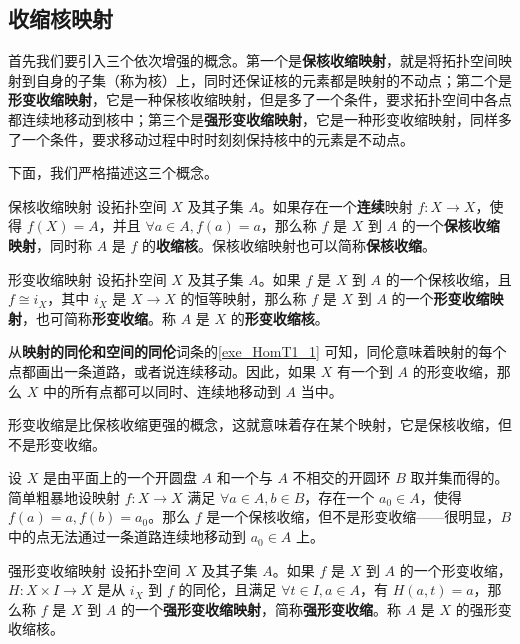 

\subsection{收缩核映射}

首先我们要引入三个依次增强的概念。第一个是\textbf{保核收缩映射}，就是将拓扑空间映射到自身的子集（称为核）上，同时还保证核的元素都是映射的不动点；第二个是\textbf{形变收缩映射}，它是一种保核收缩映射，但是多了一个条件，要求拓扑空间中各点都连续地移动到核中；第三个是\textbf{强形变收缩映射}，它是一种形变收缩映射，同样多了一个条件，要求移动过程中时时刻刻保持核中的元素是不动点。

下面，我们严格描述这三个概念。

\begin{definition}{保核收缩映射}
设拓扑空间 $X$ 及其子集 $A$。如果存在一个\textbf{连续}映射 $f:X\rightarrow X$，使得 $f(X)=A$，并且 $\forall a\in A, f(a)=a$，那么称 $f$ 是 $X$ 到 $A$ 的一个\textbf{保核收缩映射}，同时称 $A$ 是 $f$ 的\textbf{收缩核}。保核收缩映射也可以简称\textbf{保核收缩}。
\end{definition}

\begin{definition}{形变收缩映射}
设拓扑空间 $X$ 及其子集 $A$。如果 $f$ 是 $X$ 到 $A$ 的一个保核收缩，且 $f\cong i_X$，其中 $i_X$ 是 $X\rightarrow X$ 的恒等映射，那么称 $f$ 是 $X$ 到 $A$ 的一个\textbf{形变收缩映射}，也可简称\textbf{形变收缩}。称 $A$ 是 $X$ 的\textbf{形变收缩核}。
\end{definition}

从\textbf{映射的同伦和空间的同伦}词条的\autoref{exe_HomT1_1} 可知，同伦意味着映射的每个点都画出一条道路，或者说连续移动。因此，如果 $X$ 有一个到 $A$ 的形变收缩，那么 $X$ 中的所有点都可以同时、连续地移动到 $A$ 当中。

形变收缩是比保核收缩更强的概念，这就意味着存在某个映射，它是保核收缩，但不是形变收缩。

\begin{example}{}
设 $X$ 是由平面上的一个开圆盘 $A$ 和一个与 $A$ 不相交的开圆环 $B$ 取并集而得的。简单粗暴地设映射 $f:X\rightarrow X$ 满足 $\forall a\in A, b\in B$，存在一个 $a_0\in A$，使得 $f(a)=a, f(b)=a_0$。那么 $f$ 是一个保核收缩，但不是形变收缩——很明显，$B$ 中的点无法通过一条道路连续地移动到 $a_0\in A$ 上。
\end{example}

\begin{definition}{强形变收缩映射}\label{def_HomT2_1}
设拓扑空间 $X$ 及其子集 $A$。如果 $f$ 是 $X$ 到 $A$ 的一个形变收缩，$H:X\times I\rightarrow X$ 是从 $i_X$ 到 $f$ 的同伦，且满足 $\forall t\in I, a\in A$，有 $H(a, t)=a$，那么称 $f$ 是 $X$ 到 $A$ 的一个\textbf{强形变收缩映射}，简称\textbf{强形变收缩}。称 $A$ 是 $X$ 的强形变收缩核。
\end{definition}

